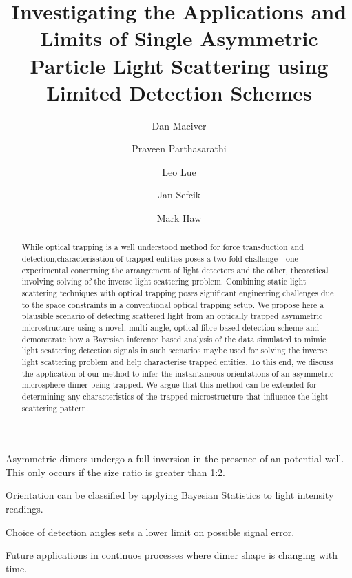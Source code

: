 \documentclass[final, 3p]{elsarticle}
\begin{document}
\begin{frontmatter}

\title{Investigating the Applications and Limits of Single Asymmetric Particle Light Scattering using Limited Detection Schemes}


\author[aff1]{Dan Maciver} 

\author[aff1]{Praveen Parthasarathi}

\author[aff1]{Leo Lue}

\author[aff1]{Jan Sefcik}

\author[aff1]{Mark Haw}






\begin{abstract}
\justifying
While optical trapping is a well understood method for force transduction and detection,characterisation of trapped entities poses a two-fold challenge - one experimental concerning the arrangement of light detectors and the other, theoretical involving solving of the inverse light scattering problem. Combining static light scattering techniques with optical trapping poses significant engineering challenges due to the space constraints in a conventional optical trapping setup. We propose here a plausible scenario of detecting scattered light from an optically trapped asymmetric microstructure using a novel, multi-angle, optical-fibre based detection scheme and demonstrate how a Bayesian inference based analysis of the data simulated to mimic light scattering detection signals in such scenarios maybe used for solving the inverse light scattering problem and help characterise trapped entities. To this end, we discuss the application of our method to infer the instantaneous orientations of an asymmetric microsphere dimer being trapped. We argue that this method can be extended for determining any characteristics of the trapped microstructure that influence the light scattering pattern.
\end{abstract}

\begin{highlights}
\item Asymmetric dimers undergo a full inversion in the presence of an potential well. This only occurs if the size ratio is greater than 1:2.  
\item Orientation can be classified by applying Bayesian Statistics to light intensity readings. 
\item Choice of detection angles sets a lower limit on possible signal error. 
\item Future applications in continuos processes where dimer shape is changing with time.   
\end{highlights}


\end{frontmatter}
\end{document}
